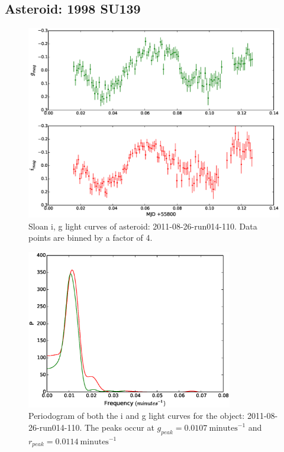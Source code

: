 \subsection{Asteroid: 1998 SU139}

\begin{figure}
  \center
  \includegraphics[width=140mm]{images/2011-08-26-run014-110-lightcurve-bin4.eps} 
  \caption{Sloan i, g light curves of asteroid: 2011-08-26-run014-110. Data points are binned by a factor of 4.}
  \label{fig:2011-08-26-run014-110}
\end{figure}


\begin{figure}
  \center
  \includegraphics[width=90mm]{images/2011-08-26-run014-110-pgram-bin4.eps} 
  \caption{Periodogram of both the i and g light curves for the object: 2011-08-26-run014-110. The peaks occur at $g_{peak} = 0.0107 \ \mbox{minutes}^{-1}$ and  $r_{peak} = 0.0114\ \mbox{minutes}^{-1}$ }
  \label{fig:asteroidpgram}
\end{figure}

